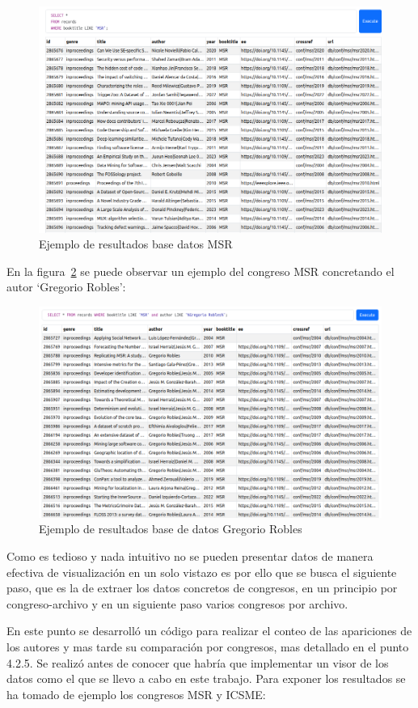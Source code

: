 \documentclass[a4paper, 12pt]{book}
\begin{document}
\begin{figure}[h]
  \centering
  \includegraphics[width=11.5cm, keepaspectratio]{img/ej_sqlite_MSR.png}
  \caption{Ejemplo de resultados base datos MSR}
  \label{fig:ej_sqlite}
\end{figure}

En la figura~\ref{fig:ej_GR} se puede observar un ejemplo del congreso MSR concretando el autor `Gregorio Robles':

\begin{figure}[h]
  \centering
  \includegraphics[width=11.5cm, keepaspectratio]{img/ej_bd_GR.png}
  \caption{Ejemplo de resultados base de datos Gregorio Robles}
  \label{fig:ej_GR}
\end{figure}

Como es tedioso y nada intuitivo no se pueden presentar datos de manera efectiva de visualización en un solo vistazo es por ello que se busca el siguiente paso, que es la de extraer los datos concretos de congresos, en un principio por congreso-archivo y en un siguiente paso varios congresos por archivo.

En este punto se desarrolló un código para realizar el conteo de las apariciones de los autores y mas tarde su comparación por congresos, mas detallado en el punto 4.2.5.
Se realizó antes de conocer que habría que implementar un visor de los datos como el que se llevo a cabo en este trabajo. Para exponer los resultados se ha tomado de ejemplo los congresos MSR y ICSME:
\end{document}
